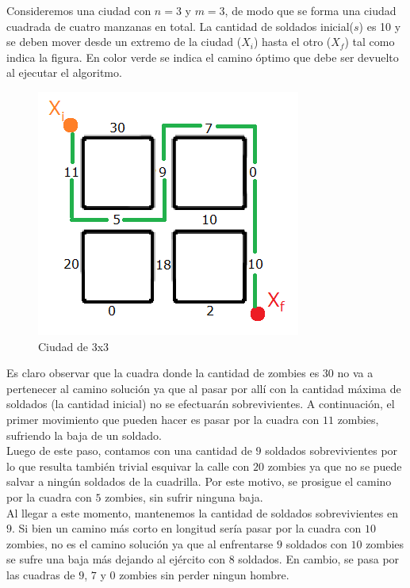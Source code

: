 Consideremos una ciudad con $n=3$ y $m=3$, de modo que se forma una ciudad cuadrada de cuatro manzanas en total. La cantidad de soldados inicial($s$) es 10 y se deben mover desde un extremo de la ciudad ($X_i$) hasta el otro ($X_f$) tal como indica la figura. En color verde se indica el camino \'optimo que debe ser devuelto al ejecutar el algoritmo.\\

  \begin{figure}[h!]
   \begin{center}
 	\includegraphics[scale=0.3]{imagenes/ej2/cuadras.png}
 	\caption{Ciudad de 3x3}
 	\label{ejemplitoCiudad}
   \end{center}
 \end{figure}

\newpage

Es claro observar que la cuadra donde la cantidad de zombies es $30$ no va a pertenecer al camino soluci\'on ya que al pasar por all\'i con la cantidad m\'axima de soldados (la cantidad inicial) no se efectuar\'an sobrevivientes. A continuaci\'on, el primer movimiento que pueden hacer es pasar por la cuadra con $11$ zombies, sufriendo la baja de un soldado.\\

Luego de este paso, contamos con una cantidad de $9$ soldados sobrevivientes por lo que resulta tambi\'en trivial esquivar la calle con $20$ zombies ya que no se puede salvar a ning\'un soldados de la cuadrilla. Por este motivo, se prosigue el camino por la cuadra con $5$ zombies, sin sufrir ninguna baja.\\

Al llegar a este momento, mantenemos la cantidad de soldados sobrevivientes en $9$. Si bien un camino m\'as corto en longitud ser\'ia pasar por la cuadra con $10$ zombies, no es el camino soluci\'on ya que al enfrentarse $9$ soldados con $10$ zombies se sufre una baja m\'as dejando al ej\'ercito con $8$ soldados. En cambio, se pasa por las cuadras de $9$, $7$ y $0$ zombies sin perder ningun hombre.\\

